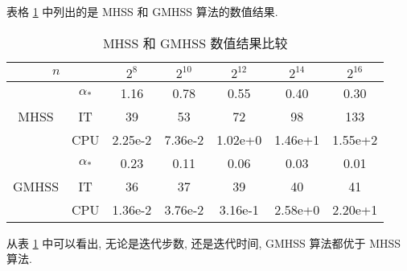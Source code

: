 \documentclass[UTF8]{ctexart}
\theoremstyle{plain}
\theoremstyle{nonumberplain}
\numberwithin{equation}{section} %
\begin{document}
表格 \ref{Tab:11} 中列出的是 MHSS 和 GMHSS 算法的数值结果.

\begin{table}[H]
\begin{center}
\caption{MHSS 和 GMHSS 数值结果比较\label{Tab:11}}\smallskip
\begin{tabular}{|c|c|c|c|c|c|c|} \hline
  \multicolumn{2}{|c|}{$n$}& $2^8$ &$2^{10}$ &$2^{12}$ &$2^{14}$ &$2^{16}$  \\ \hline
      & $\alpha_{*}$ & 1.16  & 0.78  & 0.55  & 0.40    & 0.30     \\ \cline{2-7}
 MHSS & IT           &  39   &  53   &  72   &  98     & 133      \\ \cline{2-7}
      & CPU          &2.25e-2&7.36e-2& 1.02e+0& 1.46e+1 & 1.55e+2  \\ \hline
      & $\alpha_{*}$ & 0.23  & 0.11  & 0.06  & 0.03    & 0.01     \\ \cline{2-7}
GMHSS & IT           &  36   &  37   &  39   &  40     & 41       \\ \cline{2-7}
      & CPU          &1.36e-2&3.76e-2&3.16e-1&  2.58e+0 & 2.20e+1  \\ \hline
\end{tabular}
\end{center}
\end{table}

从表 \ref{Tab:11} 中可以看出, 无论是迭代步数, 还是迭代时间, GMHSS 算法都优于 MHSS 算法.
\end{document}
